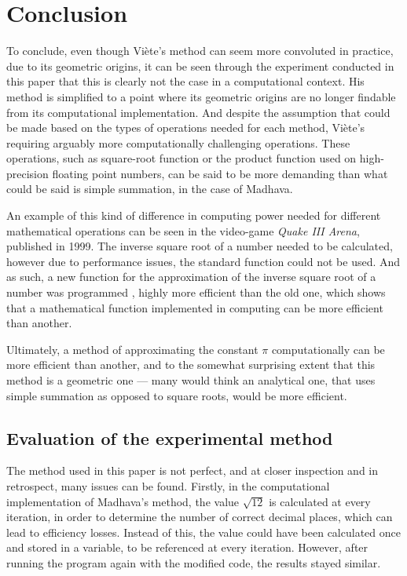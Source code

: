 \section{Conclusion}

To conclude, even though Viète's method can seem more convoluted in practice, due to its geometric origins, it can be seen through the experiment conducted in this paper that this is clearly not the case in a computational context. His method is simplified to a point where its geometric origins are no longer findable from its computational implementation. And despite the assumption that could be made based on the types of operations needed for each method, Viète's requiring arguably more computationally challenging operations. These operations, such as square-root function or the product function used on high-precision floating point numbers, can be said to be more demanding than what could be said is simple summation, in the case of Madhava. 

An example of this kind of difference in computing power needed for different mathematical operations can be seen in the video-game \textit{Quake III Arena}, published in 1999. The inverse square root of a number needed to be calculated, however due to performance issues, the standard function could not be used. And as such, a new function for the approximation of the inverse square root of a number was programmed \cite{id-software_2012}\cite{beyond3d_2006}, highly more efficient than the old one, which shows that a mathematical function implemented in computing can be more efficient than another. 

Ultimately, a method of approximating the constant $\pi$ computationally can be more efficient than another, and to the somewhat surprising extent that this method is a geometric one --- many would think an analytical one, that uses simple summation as opposed to square roots, would be more efficient. 


\subsection{Evaluation of the experimental method}

The method used in this paper is not perfect, and at closer inspection and in retrospect, many issues can be found. Firstly, in the computational implementation of Madhava's method, the value $\sqrt{12}$ is calculated at every iteration, in order to determine the number of correct decimal places, which can lead to efficiency losses. Instead of this, the value could have been calculated once and stored in a variable, to be referenced at every iteration. However, after running the program again with the modified code, the results stayed similar. 

